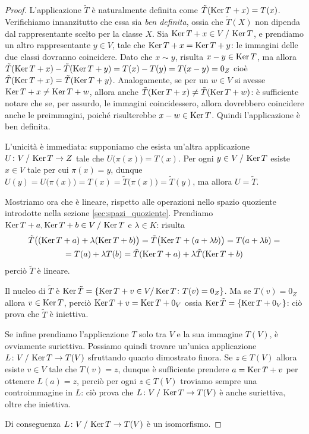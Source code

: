 \begin{proof}
	L'applicazione $\tilde{T}$ è naturalmente definita come $\tilde{T}(\operatorname{Ker} T+x)=T(x)$.
	Verifichiamo innanzitutto che essa sia \emph{ben definita}, ossia che $\tilde{T}(X)$ non dipenda dal rappresentante scelto per la classe $X$.
	Sia $\operatorname{Ker} T+x\in V\,/\,\operatorname{Ker} T$, e prendiamo un altro rappresentante $y\in V$, tale che $\operatorname{Ker} T+x=\operatorname{Ker} T+y$: le immagini delle due classi dovranno coincidere.
	Dato che $x\sim y$, risulta $x-y\in\operatorname{Ker} T$, ma allora $\tilde{T}(\operatorname{Ker} T+x)-\tilde{T}(\operatorname{Ker} T+y)=T(x)-T(y)=T(x-y)=0_Z$ cioè $\tilde{T}(\operatorname{Ker} T+x)=\tilde{T}(\operatorname{Ker} T+y)$.
	Analogamente, se per un $w\in V$ si avesse $\operatorname{Ker} T+x\ne\operatorname{Ker} T+w$, allora anche $\tilde{T}(\operatorname{Ker} T+x)\ne\tilde{T}(\operatorname{Ker} T+w)$: è sufficiente notare che se, per assurdo, le immagini coincidessero, allora dovrebbero coincidere anche le preimmagini, poich\'e risulterebbe $x-w\in\operatorname{Ker} T$.
	Quindi l'applicazione è ben definita.

	L'unicità è immediata: supponiamo che esista un'altra applicazione $U\colon V\,/\,\operatorname{Ker} T\to Z$ tale che $U\big(\pi(x)\big)=T(x)$.
	Per ogni $y\in V\,/\,\operatorname{Ker} T$ esiste $x\in V$ tale per cui $\pi(x)=y$, dunque $U(y)=U\big(\pi(x)\big)=T(x)=\tilde{T}\big(\pi(x)\big)=\tilde{T}(y)$, ma allora $U=\tilde{T}$.

	Mostriamo ora che è lineare, rispetto alle operazioni nello spazio quoziente introdotte nella sezione \ref{sec:spazi_quoziente}.
	Prendiamo $\operatorname{Ker} T+a,\operatorname{Ker} T+b\in V\,/\,\operatorname{Ker} T$ e $\lambda\in K$: risulta
	\begin{multline}
		\tilde{T}\big((\operatorname{Ker} T+a)+\lambda(\operatorname{Ker} T+b)\big)=\tilde{T}\big(\!\operatorname{Ker} T+(a+\lambda b)\big)=T(a+\lambda b)=\\=T(a)+\lambda T(b)=\tilde{T}(\operatorname{Ker} T+a)+\lambda\tilde{T}(\operatorname{Ker} T+b)
	\end{multline}
	perciò $\tilde{T}$ è lineare.

	Il nucleo di $\tilde{T}$ è $\operatorname{Ker}\tilde{T}=\{\operatorname{Ker} T+v\in V/\operatorname{Ker} T\colon T(v)=0_Z\}$.
	Ma se $T(v)=0_Z$ allora $v\in\operatorname{Ker} T$, perciò $\operatorname{Ker} T+v=\operatorname{Ker} T+0_V$ ossia $\operatorname{Ker}\tilde{T}=\{\operatorname{Ker} T+0_V\}$: ciò prova che $\tilde{T}$ è iniettiva.

	Se infine prendiamo l'applicazione $T$ solo tra $V$ e la sua immagine $T(V)$, è ovviamente suriettiva.
	Possiamo quindi trovare un'unica applicazione $L\colon V\,/\,\operatorname{Ker} T\to T(V)$ sfruttando quanto dimostrato finora.
	Se $z\in T(V)$ allora esiste $v\in V$ tale che $T(v)=z$, dunque è sufficiente prendere $a=\operatorname{Ker} T+v$ per ottenere $L(a)=z$, perciò per ogni $z\in T(V)$ troviamo sempre una controimmagine in $L$: ciò prova che $L\colon V\,/\,\operatorname{Ker} T\to T(V)$ è anche suriettiva, oltre che iniettiva.
	
	Di conseguenza $L\colon V\,/\,\operatorname{Ker} T\to T(V)$ è un isomorfismo.
\end{proof}

